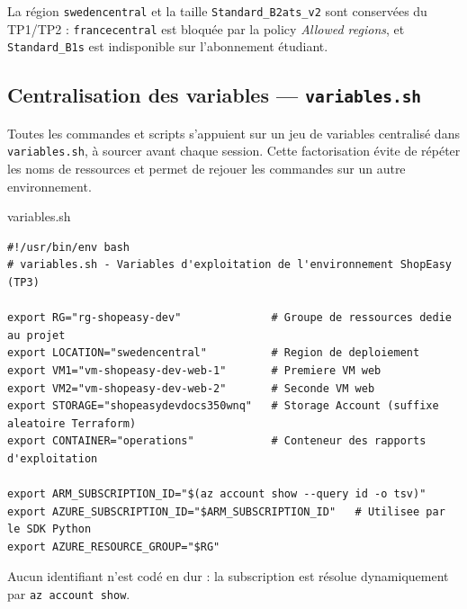 \documentclass[11pt,a4paper]{article}
\newcommand{\code}[1]{\texttt{#1}}
\begin{document}
\begin{tipbox}
La région \code{swedencentral} et la taille \code{Standard\_B2ats\_v2} sont conservées du TP1/TP2 : \code{francecentral} est bloquée par la policy \textit{Allowed regions}, et \code{Standard\_B1s} est indisponible sur l'abonnement étudiant.
\end{tipbox}

\subsection{Centralisation des variables — \code{variables.sh}}
Toutes les commandes et scripts s'appuient sur un jeu de variables centralisé dans \code{variables.sh}, à sourcer avant chaque session. Cette factorisation évite de répéter les noms de ressources et permet de rejouer les commandes sur un autre environnement.

\begin{codebox}{variables.sh}
\begin{Verbatim}
#!/usr/bin/env bash
# variables.sh - Variables d'exploitation de l'environnement ShopEasy (TP3)

export RG="rg-shopeasy-dev"              # Groupe de ressources dedie au projet
export LOCATION="swedencentral"          # Region de deploiement
export VM1="vm-shopeasy-dev-web-1"       # Premiere VM web
export VM2="vm-shopeasy-dev-web-2"       # Seconde VM web
export STORAGE="shopeasydevdocs350wnq"   # Storage Account (suffixe aleatoire Terraform)
export CONTAINER="operations"            # Conteneur des rapports d'exploitation

export ARM_SUBSCRIPTION_ID="$(az account show --query id -o tsv)"
export AZURE_SUBSCRIPTION_ID="$ARM_SUBSCRIPTION_ID"   # Utilisee par le SDK Python
export AZURE_RESOURCE_GROUP="$RG"
\end{Verbatim}
\end{codebox}

Aucun identifiant n'est codé en dur : la subscription est résolue dynamiquement par \code{az account show}.
\end{document}
